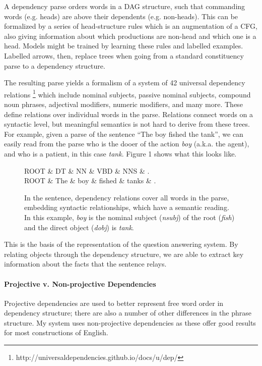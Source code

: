 \documentclass[twoside]{article}
\begin{document}
A dependency parse orders words in a DAG structure, such that commanding words (e.g. heads) are above their dependents (e.g. non-heads).  This can be formalized by a series of head-structure rules which is an augmentation of a CFG, also giving information about which productions are non-head and which one is a head.  Models might be trained by learning these rules and labelled examples.  Labelled arrows, then, replace trees when going from a standard constituency parse to a dependency structure.

The resulting parse yields a formalism of a system of 42 universal dependency relations \footnote{http://universaldependencies.github.io/docs/u/dep/} which include nominal subjects, passive nominal subjects, compound noun phrases, adjectival modifiers, numeric modifiers, and many more.  These define relations over individual words in the parse.  Relations connect words on a syntactic level, but meaningful semantics is not hard to derive from these trees.  For example, given a parse of the sentence ``The boy fished the tank'', we can easily read from the parse who is the dooer of the action \textit{boy} (a.k.a. the agent), and who is a patient, in this case \textit{tank}.  Figure 1 shows what this looks like.

\begin{figure}
\centering
\caption{In the sentence, dependency relations cover all words in the parse, embedding syntactic relationships, which have a semantic reading.  In this example, \textit{boy} is the nominal subject (\textit{nsubj}) of the root (\textit{fish}) and the direct object (\textit{dobj}) is \textit{tank}.} \label{fig:deps}
\begin{dependency}[edge horizontal padding=10pt]\begin{deptext}[column sep=0.3cm]ROOT \& DT \& NN \& VBD \& NNS \& .\\ROOT \& The \& boy \& fished \& tanks \& .\\\end{deptext}\end{dependency}
\end{figure}

This is the basis of the representation of the question answering system.  By relating objects through the dependency structure, we are able to extract key information about the facts that the sentence relays.

\paragraph{Projective v. Non-projective Dependencies} Projective dependencies are used to better represent free word order in dependency structure; there are also a number of other differences in the phrase structure.  My system uses non-projective dependencies as these offer good results for most constructions of English.
\end{document}

